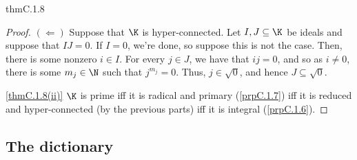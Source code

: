 \begin{thm}{}{thmC.1.8}
\begin{proof}
		$(\Leftarrow )$ Suppose that $\K$ is hyper-connected.  Let $I,J\subseteq \K$ be ideals and suppose that $IJ=0$.  If $I=0$, we're done, so suppose this is not the case.  Then, there is some nonzero $i\in I$.  For every $j\in J$, we have that $ij=0$, and so as $i\neq 0$, there is some $m_j\in \N$ such that $j^{m_j}=0$.  Thus, $j\in \sqrt{0}$, and hence $J\subseteq \sqrt{0}$.
		
		\blni
		\cref{thmC.1.8(ii)} $\K$ is prime iff it is radical and primary (\cref{prpC.1.7}) iff it is reduced and hyper-connected (by the previous parts) iff it is integral (\cref{prpC.1.6}).
	\end{proof}
\end{thm}

\subsection{The dictionary}

